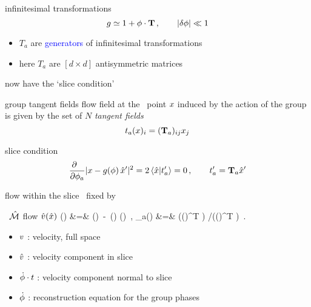 \begin{frame}{} %
\begin{block}{infinitesimal transformations}
\[
g
 \simeq  1 + {\bf \phi} \cdot \mathbf{T} \,, \qquad \vert \delta {\bf \phi} \vert \ll 1
\]
\end{block}
\begin{block}{} %
\begin{itemize}
  \item $T_a$ are \textcolor{blue}{generators} of infinitesimal
transformations
  \item here $T_a$ are $[d\!\times\!d]$ antisymmetric matrices
\end{itemize}
\end{block}
\end{frame}

\begin{frame}{now have the `slice condition'}
\begin{block}{group tangent fields}
flow field at the \statesp\
point $x$ induced by the action of the group is given by
the set of $N$ \emph{tangent fields}
\[
t_a(x)_{i}= (\mathbf{T}_a){}_{ij} x_j
\] %
\end{block}
\bigskip
\begin{block}{slice condition}
\[ %
\frac{\partial ~~}{\partial \gSpace_a} |\ssp - \LieEl(\gSpace)\,\slicep|^2
   =
2\, \braket{\sspRed}{\sliceTan{a}}
   = 0
    \,,\qquad
	  \sliceTan{a} = \Lg_a \slicep
\] %
\end{block}
\end{frame}

\begin{frame}{flow within the slice}
\slice\ fixed by \slicep

\bigskip
	\begin{exampleblock}
          {\reducedsp\ $\hat{\cal M}$  flow $\hat{v}(\hat{x})$}
\bea
\velRed(\sspRed) &=& \vel(\sspRed)
                    \,-\, \dot{\gSpace}(\sspRed)  \cdot \groupTan(\sspRed)
    \,,\qquad\quad \sspRed \in \pSRed
\continue
\dot{\gSpace}_a(\sspRed) &=& (\vel(\sspRed)^T )
                       /(\groupTan(\sspRed)^T \cdot \sliceTan{})
\,.
\nnu %
\eea
	\end{exampleblock}
\begin{itemize}
  \item $v$ : velocity, full space
  \item $\hat{v}$ : velocity component in slice
  \item $\dot{{\bf \phi}}  \cdot t$ : velocity component normal to slice
  \item $\dot{{\bf \phi}}$ : reconstruction equation for the group phases
\end{itemize}
\end{frame}

